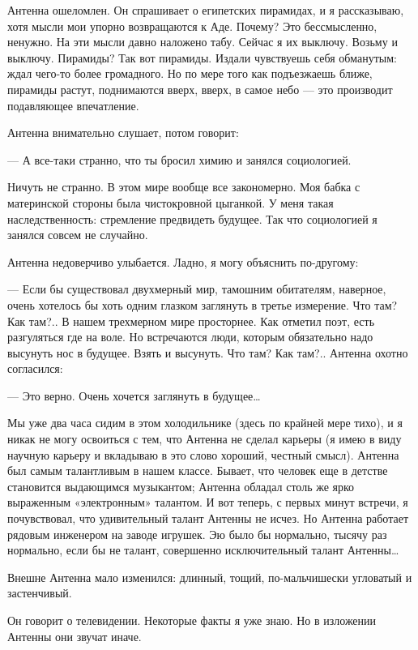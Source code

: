    Антенна ошеломлен. Он спрашивает о египетских пирамидах, и я  рассказываю,
   хотя мысли  мои  упорно  возвращаются к  Аде.  Почему?  Это  бессмысленно,
   ненужно. На эти мысли давно наложено  табу. Сейчас я их выключу. Возьму  и
   выключу. Пирамиды?  Так вот  пирамиды. Издали  чувствуешь себя  обманутым:
   ждал чего-то  более громадного.  Но по  мере того  как подъезжаешь  ближе,
   пирамиды растут, поднимаются вверх, вверх,  в самое небо — это  производит
   подавляющее впечатление.

   Антенна внимательно слушает, потом говорит:

   — А все-таки странно, что ты бросил химию и занялся социологией.

   Ничуть не  странно.  В этом  мире  вообще  все закономерно.  Моя  бабка  с
   материнской   стороны   была   чистокровной   цыганкой.   У   меня   такая
   наследственность: стремление  предвидеть будущее.  Так что  социологией  я
   занялся совсем не случайно.

   Антенна недоверчиво улыбается. Ладно, я могу объяснить по-другому:

   — Если бы существовал двухмерный мир, тамошним обитателям, наверное, очень
   хотелось бы хоть одним глазком заглянуть в третье измерение. Что там?  Как
   там?..  В  нашем  трехмерном  мире  просторнее.  Как  отметил  поэт,  есть
   разгуляться где на  воле. Но  встречаются люди,  которым обязательно  надо
   высунуть нос в  будущее. Взять  и высунуть.  Что там?  Как там?..  Антенна
   охотно согласился:

   — Это верно. Очень хочется заглянуть в будущее…

   Мы уже два часа сидим в этом холодильнике (здесь по крайней мере тихо),  и
   я никак не могу освоиться с тем,  что Антенна не сделал карьеры (я имею  в
   виду научную  карьеру и  вкладываю в  это слово  хороший, честный  смысл).
   Антенна был самым талантливым  в нашем классе. Бывает,  что человек еще  в
   детстве становится выдающимся  музыкантом; Антенна обладал  столь же  ярко
   выраженным «электронным» талантом. И вот теперь, с первых минут встречи, я
   почувствовал,  что  удивительный  талант  Антенны  не  исчез.  Но  Антенна
   работает рядовым инженером на заводе игрушек. Эю было бы нормально, тысячу
   раз  нормально,  если  бы  не  талант,  совершенно  исключительный  талант
   Антенны…

   Внешне Антенна мало изменился: длинный, тощий, по-мальчишески угловатый  и
   застенчивый.

   Он говорит  о телевидении.  Некоторые факты  я уже  знаю. Но  в  изложении
   Антенны они звучат иначе.

